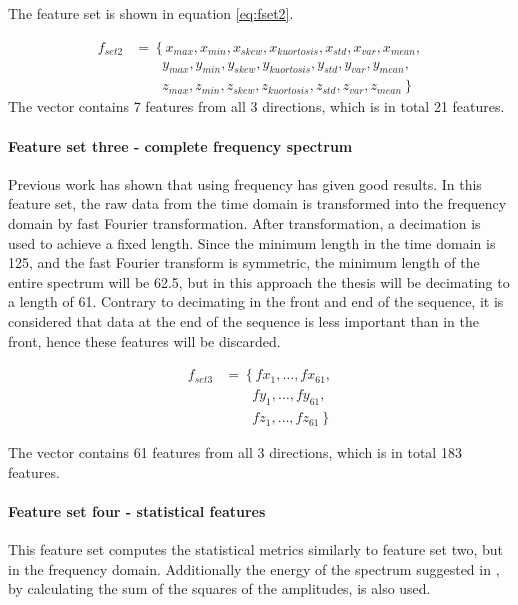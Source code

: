 \documentclass[USenglish]{ifimaster}  %
\begin{document}
The feature set is shown in equation \ref{eq:fset2}. 
	
\begin{align}\label{eq:fset2}
	f_{set2} &= \left\{x_{max},x_{min},x_{skew},x_{kuortosis},x_{std},x_{var},x_{mean}, \right.\nonumber\\
	&\qquad \left.{} y_{max},y_{min},y_{skew},y_{kuortosis},y_{std},y_{var},y_{mean}, \right.\nonumber\\
	&\qquad \left.{} z_{max},z_{min},z_{skew},z_{kuortosis},z_{std},z_{var},z_{mean} \right\}
\end{align}
The vector contains 7 features from all 3 directions, which is in total 21 features. 
	
\paragraph{Feature set three - complete frequency spectrum} 
Previous work has shown that using frequency has given good results. In this feature set, the raw data from the time domain is transformed into the frequency domain by fast Fourier transformation. After transformation, a decimation is used to achieve a fixed length. Since the minimum length in the time domain is 125, and the fast Fourier transform is symmetric, the minimum length of the entire spectrum will be 62.5, but in this approach the thesis will be decimating to a length of 61. Contrary to decimating in the front and end of the sequence, it is considered that data at the end of the sequence is less important than in the front, hence these features will be discarded.
	
\begin{align}\label{eq:f1}
f_{set3} &= \left\{fx_1,\dotsc,fx_{61}, \right.\nonumber\\
&\qquad \left.{} fy_1, \dotsc,fy_{61}, \right.\nonumber\\
&\qquad \left.{} fz_1,\dotsc,fz_{61}\right\}
\end{align}

The vector contains 61 features from all 3 directions, which is in total 183 features. 
	
\paragraph{Feature set four - statistical features} 
This feature set computes the statistical metrics similarly to feature set two, but in the frequency domain. Additionally the energy of the spectrum suggested in \cite{26b23e912c654fe4b7478fd910130195}, by calculating the sum of the squares of the amplitudes, is also used.
	
\end{document}

